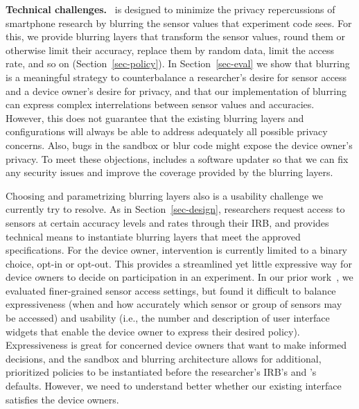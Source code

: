 \textbf{Technical challenges.}~
\sysname is designed to minimize the privacy repercussions 
of smartphone research by blurring the sensor values that experiment 
code sees. For this, we provide blurring layers that transform the sensor 
values, round them or otherwise limit their accuracy, replace them by 
random data, limit the access rate, and so on (Section~\ref{sec-policy}). 
In Section~\ref{sec-eval} we show that blurring is a meaningful strategy to 
counterbalance a researcher's desire for sensor access and a device 
owner's desire for privacy, and that our implementation of blurring 
can express complex interrelations between sensor values and accuracies. 
However, this does not guarantee that the existing blurring layers and 
configurations will always be able to address adequately all possible 
privacy concerns. Also, bugs in the sandbox or blur code might 
expose the device owner's privacy.  
To meet these objections, \sysname includes a software 
updater so that we can fix any security issues and 
improve the coverage provided by the blurring layers.


Choosing and parametrizing blurring layers also is a usability 
challenge we currently try to resolve. As in Section~\ref{sec-design}, 
researchers request access to sensors at certain accuracy levels 
and rates through their IRB, and \sysname provides technical means 
to instantiate blurring layers that meet the approved specifications. 
For the device owner, intervention is currently limited to a binary 
choice, opt-in or opt-out. This provides a streamlined yet little 
expressive way for device owners to decide on participation in an 
experiment. In our prior work~\cite{sensorium, rafetseder2013sensorium}, 
we evaluated finer-grained sensor access settings, but found it difficult to 
balance expressiveness (when and how accurately which 
sensor or group of sensors may be accessed) and usability (i.e., 
the number and description of user interface widgets that enable 
the device owner to express their desired policy).
Expressiveness is great for concerned device owners 
that want to make informed decisions, and the sandbox and blurring 
architecture allows for additional, prioritized policies to be 
instantiated before the researcher's IRB's and \sysname's defaults. 
However, we need to understand better whether our existing interface 
satisfies the device owners.


